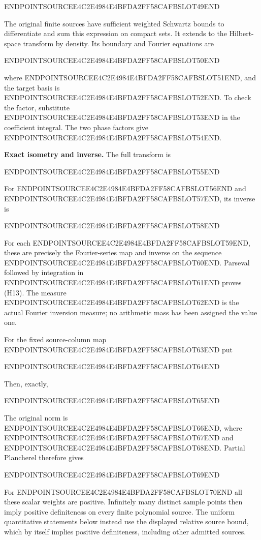 ENDPOINTSOURCEE4C2E4984E4BFDA2FF58CAFBSLOT49END

The original finite sources have sufficient weighted Schwartz bounds to differentiate and sum this expression on compact sets. It extends to the Hilbert-space transform by density. Its boundary and Fourier equations are

ENDPOINTSOURCEE4C2E4984E4BFDA2FF58CAFBSLOT50END

where ENDPOINTSOURCEE4C2E4984E4BFDA2FF58CAFBSLOT51END, and the target basis is ENDPOINTSOURCEE4C2E4984E4BFDA2FF58CAFBSLOT52END. To check the factor, substitute ENDPOINTSOURCEE4C2E4984E4BFDA2FF58CAFBSLOT53END in the coefficient integral. The two phase factors give ENDPOINTSOURCEE4C2E4984E4BFDA2FF58CAFBSLOT54END.

\textbf{Exact isometry and inverse.} The full transform is

ENDPOINTSOURCEE4C2E4984E4BFDA2FF58CAFBSLOT55END

For ENDPOINTSOURCEE4C2E4984E4BFDA2FF58CAFBSLOT56END and ENDPOINTSOURCEE4C2E4984E4BFDA2FF58CAFBSLOT57END, its inverse is

ENDPOINTSOURCEE4C2E4984E4BFDA2FF58CAFBSLOT58END

For each ENDPOINTSOURCEE4C2E4984E4BFDA2FF58CAFBSLOT59END, these are precisely the Fourier-series map and inverse on the sequence ENDPOINTSOURCEE4C2E4984E4BFDA2FF58CAFBSLOT60END. Parseval followed by integration in ENDPOINTSOURCEE4C2E4984E4BFDA2FF58CAFBSLOT61END proves (H13). The measure ENDPOINTSOURCEE4C2E4984E4BFDA2FF58CAFBSLOT62END is the actual Fourier inversion measure; no arithmetic mass has been assigned the value one.

For the fixed source-column map ENDPOINTSOURCEE4C2E4984E4BFDA2FF58CAFBSLOT63END put

ENDPOINTSOURCEE4C2E4984E4BFDA2FF58CAFBSLOT64END

Then, exactly,

ENDPOINTSOURCEE4C2E4984E4BFDA2FF58CAFBSLOT65END

The original norm is ENDPOINTSOURCEE4C2E4984E4BFDA2FF58CAFBSLOT66END, where ENDPOINTSOURCEE4C2E4984E4BFDA2FF58CAFBSLOT67END and ENDPOINTSOURCEE4C2E4984E4BFDA2FF58CAFBSLOT68END. Partial Plancherel therefore gives

ENDPOINTSOURCEE4C2E4984E4BFDA2FF58CAFBSLOT69END

For ENDPOINTSOURCEE4C2E4984E4BFDA2FF58CAFBSLOT70END all these scalar weights are positive. Infinitely many distinct sample points then imply positive definiteness on every finite polynomial source. The uniform quantitative statements below instead use the displayed relative source bound, which by itself implies positive definiteness, including other admitted sources.


